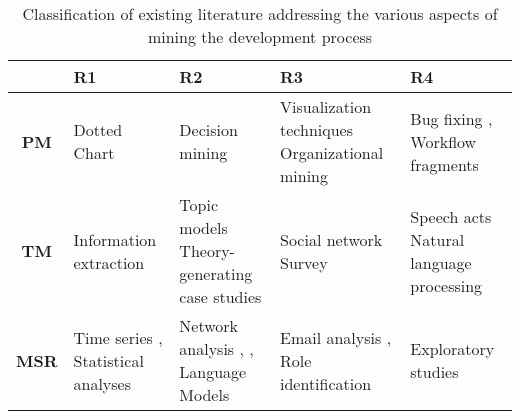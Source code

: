 \begin{table}[]
\centering
\caption{Classification of existing literature addressing the various aspects of mining the development process}
\label{table:literature-classification}
\begin{tabular}{@{}c>{\raggedright}m{3cm}>{\raggedright}m{2.5cm}>{\raggedright}m{2.5cm}>{\raggedright\arraybackslash}m{2.5cm}@{}}
\toprule
\multicolumn{1}{l}{} & \textbf{R1}                                              & \textbf{R2}                                                                                               & \textbf{R3} & \textbf{R4}                                      \\ \midrule

\textbf{PM} & Dotted Chart \citep{Song2007} & Decision mining \citep{Rozinat2006} & Visualization techniques \citep{Baumgrass2013} Organizational mining \citep{Song2008} \citep{Schonig2015} & Bug fixing \citep{Poncin2011a}, Workflow fragments \citep{DBLP:conf/se/KindlerRS06,kindler2006incremental} \\ \midrule
\textbf{TM} & Information extraction \citep{cowie1996information} & Topic models \citep{Chen2016a} Theory-generating case studies \citep{Lindberg2016} & Social network \citep{Bird2006} Survey \citep{Begel2010} \citep{DeA.R.Goncalves2010} & Speech acts \citep{DiCiccio2013a} \citep{Campos2018} Natural language processing \citep{Friedrich2011} \\ \midrule
\textbf{MSR} & Time series \citep{Ruohonen2015} \citep{Hou2014}, Statistical analyses \citep{Oliva2011} & Network analysis \citep{DAmbros2009}, \citep{Zimmermann2008}, Language Models \citep{Allamanis2013} & Email analysis \citep{Bird2006}, Role identification \citep{Yu.LiguoRamaswamy.2007} & Exploratory studies \citep{Gousios2014} \\ \bottomrule
\end{tabular}
\vspace*{-\baselineskip}
\end{table}